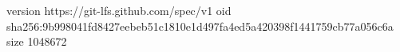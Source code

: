 version https://git-lfs.github.com/spec/v1
oid sha256:9b998041fd8427eebeb51c1810e1d497fa4ed5a420398f1441759cb77a056c6a
size 1048672
